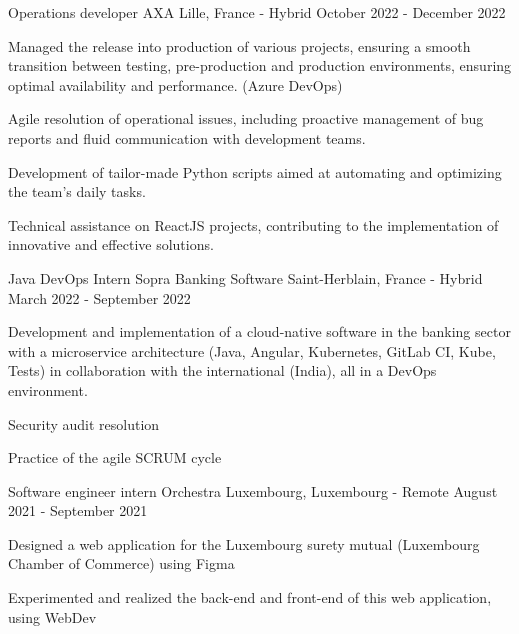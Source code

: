 \begin{cventries}
  \cventry
    {Operations developer} %
    {AXA} %
    {Lille, France - Hybrid} %
    {October 2022 - December 2022} %
    {
      \begin{cvitems} %
        \item {Managed the release into production of various projects, ensuring a smooth transition between testing, pre-production and production environments, ensuring optimal availability and performance. (Azure DevOps)}
        \item {Agile resolution of operational issues, including proactive management of bug reports and fluid communication with development teams.}
        \item {Development of tailor-made Python scripts aimed at automating and optimizing the team's daily tasks.}
        \item {Technical assistance on ReactJS projects, contributing to the implementation of innovative and effective solutions.}
      \end{cvitems}
    }

  \cventry
    {Java DevOps Intern} %
    {Sopra Banking Software} %
    {Saint-Herblain, France - Hybrid} %
    {March 2022 - September 2022} %
    {
      \begin{cvitems} %
        \item {Development and implementation of a cloud-native software in the banking sector with a microservice architecture (Java, Angular, Kubernetes, GitLab CI, Kube, Tests) in collaboration with the international (India), all in a DevOps environment.}
        \item {Security audit resolution}
        \item {Practice of the agile SCRUM cycle}
      \end{cvitems}
    }
    
  \cventry
    {Software engineer intern} %
    {Orchestra} %
    {Luxembourg, Luxembourg - Remote} %
    {August 2021 - September 2021} %
    {
      \begin{cvitems} %
        \item {Designed a web application for the Luxembourg surety mutual (Luxembourg Chamber of Commerce) using Figma}
        \item {Experimented and realized the back-end and front-end of this web application, using WebDev}
      \end{cvitems}
    }


\end{cventries}
